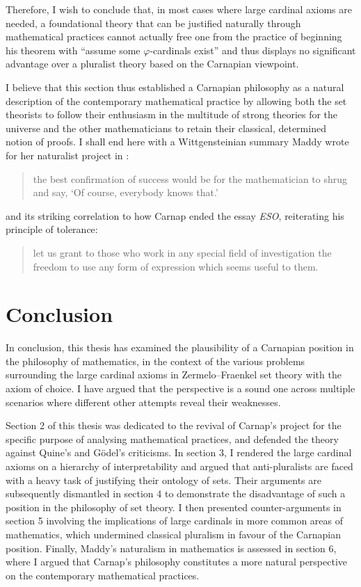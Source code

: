 \documentclass[12pt]{article}
\theoremstyle{plain}
\theoremstyle{definition}
\begin{document}
Therefore, I wish to conclude that, in most cases where large cardinal axioms are needed, a foundational theory that can be justified naturally through mathematical practices cannot actually free one from the practice of beginning his theorem with ``assume some $\varphi$-cardinals exist'' and thus displays no significant advantage over a pluralist theory based on the Carnapian viewpoint.

I believe that this section thus established a Carnapian philosophy as a natural description of the contemporary mathematical practice by allowing both the set theorists to follow their enthusiasm in the multitude of strong theories for the universe and the other mathematicians to retain their classical, determined notion of proofs. I shall end here with a Wittgensteinian summary Maddy wrote for her naturalist project in \cite{maddy-maximize}:

\begin{quote}
	the best confirmation of success would be for the mathematician to shrug and say, `Of course, everybody knows that.'
\end{quote}

and its striking correlation to how Carnap ended the essay \emph{ESO}, reiterating his principle of tolerance:

\begin{quote}
	let us grant to those who work in any special field of investigation the freedom to use any form of expression which seems useful to them.
\end{quote}

\section{Conclusion}

In conclusion, this thesis has examined the plausibility of a Carnapian position in the philosophy of mathematics, in the context of the various problems surrounding the large cardinal axioms in Zermelo--Fraenkel set theory with the axiom of choice. I have argued that the perspective is a sound one across multiple scenarios where different other attempts reveal their weaknesses.

Section 2 of this thesis was dedicated to the revival of Carnap's project for the specific purpose of analysing mathematical practices, and defended the theory against Quine's and G\"odel's criticisms. In section 3, I rendered the large cardinal axioms on a hierarchy of interpretability and argued that anti-pluralists are faced with a heavy task of justifying their ontology of sets. Their arguments are subsequently dismantled in section 4 to demonstrate the disadvantage of such a position in the philosophy of set theory. I then presented counter-arguments in section 5 involving the implications of large cardinals in more common areas of mathematics, which undermined classical pluralism in favour of the Carnapian position. Finally, Maddy's naturalism in mathematics is assessed in section 6, where I argued that Carnap's philosophy constitutes a more natural perspective on the contemporary mathematical practices.
\end{document}
